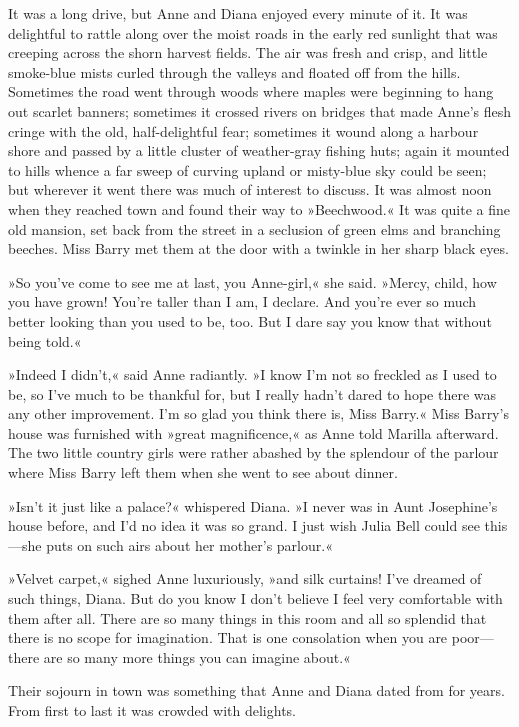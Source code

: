 It was a long drive, but Anne and Diana enjoyed every minute of it. It was delightful to rattle along over the moist roads in the early red sunlight that was creeping across the shorn harvest fields. The air was fresh and crisp, and little smoke-blue mists curled through the valleys and floated off from the hills. Sometimes the road went through woods where maples were beginning to hang out scarlet banners; sometimes it crossed rivers on bridges that made Anne’s flesh cringe with the old, half-delightful fear; sometimes it wound along a harbour shore and passed by a little cluster of weather-gray fishing huts; again it mounted to hills whence a far sweep of curving upland or misty-blue sky could be seen; but wherever it went there was much of interest to discuss. It was almost noon when they reached town and found their way to »Beechwood.« It was quite a fine old mansion, set back from the street in a seclusion of green elms and branching beeches. Miss Barry met them at the door with a twinkle in her sharp black eyes.

»So you’ve come to see me at last, you Anne-girl,« she said. »Mercy, child, how you have grown! You’re taller than I am, I declare. And you’re ever so much better looking than you used to be, too. But I dare say you know that without being told.«

»Indeed I didn’t,« said Anne radiantly. »I know I’m not so freckled as I used to be, so I’ve much to be thankful for, but I really hadn’t dared to hope there was any other improvement. I’m so glad you think there is, Miss Barry.« Miss Barry’s house was furnished with »great magnificence,« as Anne told Marilla afterward. The two little country girls were rather abashed by the splendour of the parlour where Miss Barry left them when she went to see about dinner.

»Isn’t it just like a palace?« whispered Diana. »I never was in Aunt Josephine’s house before, and I’d no idea it was so grand. I just wish Julia Bell could see this—she puts on such airs about her mother’s parlour.«

»Velvet carpet,« sighed Anne luxuriously, »and silk curtains! I’ve dreamed of such things, Diana. But do you know I don’t believe I feel very comfortable with them after all. There are so many things in this room and all so splendid that there is no scope for imagination. That is one consolation when you are poor—there are so many more things you can imagine about.«

Their sojourn in town was something that Anne and Diana dated from for years. From first to last it was crowded with delights.

